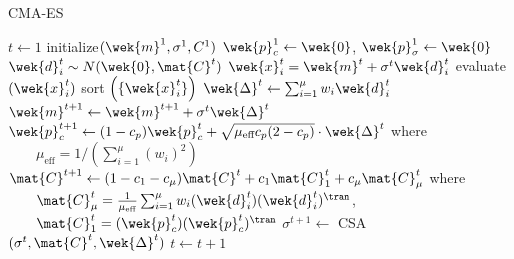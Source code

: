 \begin{algorithm}[h]
\caption{CMA-ES}
\label{alg-CMA-ES}
\begin{algorithmic}[1]
\STATE $t \gets 1$
\STATE initialize$(\wek{m}^1,\sigma^1, C^1)$
\STATE $\wek{p}_c^1 \gets \wek{0}$, $\wek{p}_\sigma^1 \gets \wek{0}$
      \STATE $ \wek{d}_i^t \sim N(\wek{0}, \mat{C}^t) $
      \STATE $\wek{x}_i^t=\wek{m}^{t} + \sigma^t \wek{d}_i^t $
      \STATE evaluate $(\wek{x}_i^t)$
   \ENDFOR
   \STATE sort $ \left(\{ \wek{x}_i^t \} \right) $
   \STATE $\wek{\Delta}^{t} \gets \sum_{i=1}^\mu w_i \wek{d}_i^t $
   \STATE $\wek{m}^{t+1} \gets \wek{m}^{t+1} + \sigma^t \wek{\Delta}^{t} $
   \STATE $\wek{p}_c^{t+1} \gets (1-c_p)\wek{p}_c^t + \sqrt{\mu_\text{eff} c_p(2-c_p)} \cdot \wek{\Delta}^{t}$ where \newline
          $\qquad \mu_\text{eff}=1/\left(\sum_{i=1}^\mu (w_i)^2\right)$
   \STATE $\mat{C}^{t+1} \gets (1-c_1-c_\mu)\mat{C}^t + c_1 \mat{C}^t_1 + c_\mu  \mat{C}^t_\mu$ where \newline
$\qquad \mat{C}_\mu^t=\frac{1}{\mu_\text{eff}}\sum_{i=1}^\mu w_i(\wek{d}_i^t)(\wek{d}_i^t)^\tran$, \newline
$\qquad \mat{C}_1^t=(\wek{p}_c^t)(\wek{p}_c^t)^\tran$
   \STATE $\sigma^{t+1} \gets $ CSA $(\sigma^t, \mat{C}^{t}, \wek{\Delta}^{t})$ 
   \STATE $t \gets t+1$
\ENDWHILE
\end{algorithmic}
\end{algorithm}
